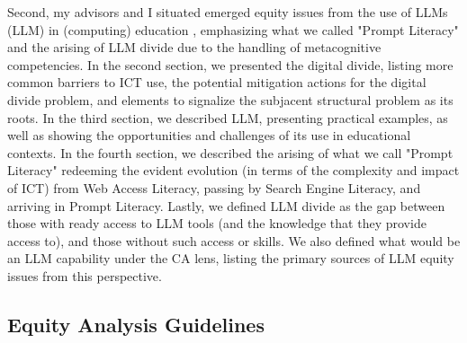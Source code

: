 Second, my advisors and I situated emerged equity issues from the use of \acrlong{LLM}s (\acrshort{LLM}) in (computing) education \cite{bispojr:2024-nmp}, emphasizing what we called "Prompt Literacy" and the arising of \gls{LLM}
divide due to the handling of metacognitive competencies. In the second section, we presented the digital divide, listing more common barriers to \gls{ICT} use, the potential mitigation actions for the digital divide problem, and elements to signalize the subjacent structural problem as its roots. In the third section, we described \gls{LLM}, presenting practical examples, as well as showing the opportunities and challenges of its use in educational contexts. In the fourth section, we described the arising of what we call "Prompt Literacy" redeeming the evident evolution (in terms of the complexity and impact of \gls{ICT}) from Web Access Literacy, passing by Search Engine Literacy, 
and arriving in Prompt Literacy. Lastly, we defined \gls{LLM} divide as the gap between those with ready access to \gls{LLM} tools (and the knowledge that they provide access to), and those without such access or skills. We also defined what would be an \gls{LLM} capability under the \gls{CA} lens, listing the primary sources of \gls{LLM} equity issues from this perspective.

\subsection{Equity Analysis Guidelines}
\label{disc-ss:eq-guidelines}

